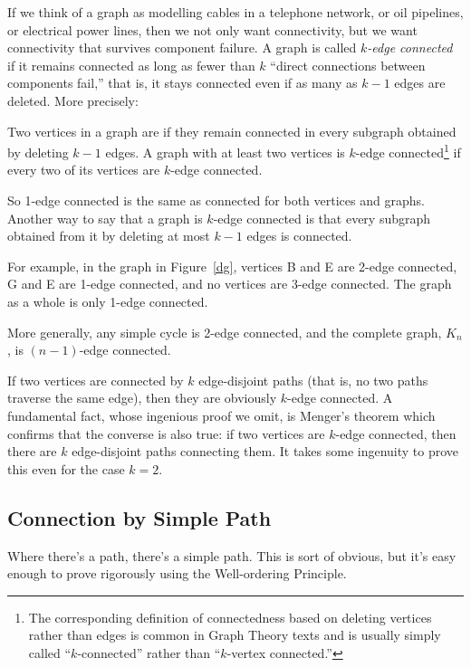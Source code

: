If we think of a graph as modelling cables in a telephone network, or oil
pipelines, or electrical power lines, then we not only want connectivity,
but we want connectivity that survives component failure.  A graph is
called \emph{$k$-edge connected} if it remains connected as long as fewer
than $k$ ``direct connections between components fail,'' that is, it stays
connected even if as many as $k-1$ edges are deleted.  More precisely:
\begin{definition}
  Two vertices in a graph are  if they remain
  connected in every subgraph obtained by deleting $k-1$ edges.  A graph
  with at least two vertices is $k$-edge connected\footnote{The
    corresponding definition of connectedness based on deleting vertices
    rather than edges is common in Graph Theory texts and is usually
    simply called ``$k$-connected'' rather than ``$k$-vertex connected.''}
  if every two of its vertices are $k$-edge connected.
\end{definition}
So 1-edge connected is the same as connected for both vertices and graphs.
Another way to say that a graph is $k$-edge connected is that every
subgraph obtained from it by deleting at most $k-1$ edges is connected.

For example, in the graph in Figure~\ref{dg}, vertices B and E are
2-edge connected, G and E are 1-edge connected, and no vertices are 3-edge connected.
The graph as a whole is only 1-edge connected.

More generally, any simple cycle is 2-edge connected, and the complete graph,
$K_n$, is $(n-1)$-edge connected.

If two vertices are connected by $k$ edge-disjoint paths (that is, no two
paths traverse the same edge), then they are obviously $k$-edge connected.
A fundamental fact, whose ingenious proof we omit, is Menger's theorem
which confirms that the converse is also true: if two vertices are
$k$-edge connected, then there are $k$ edge-disjoint paths connecting
them.  It takes some ingenuity to prove this even for the case $k=2$.




\subsection{Connection by Simple Path}

Where there's a path, there's a simple path.  This is sort of obvious, but
it's easy enough to prove rigorously using the Well-ordering Principle.

